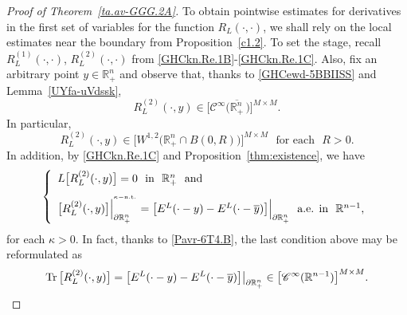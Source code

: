 \documentclass[11pt,reqno]{amsart}
\numberwithin{equation}{section}
\theoremstyle{remark}
\begin{document}
\begin{proof}[Proof of Theorem~\ref{ta.av-GGG.2A}]
To obtain pointwise estimates for derivatives in the first set of variables
for the function $R_L(\cdot,\cdot)$, we shall rely on the local estimates near 
the boundary from Proposition~\ref{c1.2}. To set the stage, recall 
$R^{(1)}_L(\cdot,\cdot)$, $R^{(2)}_L(\cdot,\cdot)$ from \eqref{GHCkn.Re.1B}-\eqref{GHCkn.Re.1C}. 
Also, fix an arbitrary point $y\in{\mathbb{R}}^n_{+}$ and observe that, thanks to 
\eqref{GHCewd-5BBIISS} and Lemma~\ref{UYfa-uVdssk}, 
%
\begin{equation}\label{Pavr-6T4.B}
R^{(2)}_L(\cdot,y)\in\big[{\mathscr{C}}^\infty\big(\overline{{\mathbb{R}}^n_{+}}\,\big)\big]^{M\times M}.
\end{equation}
%
In particular, 
%
\begin{equation}\label{GHCkn.Re.7}
R^{(2)}_L(\cdot,y)\in\big[W^{1,2}({\mathbb{R}}^n_{+}\cap B(0,R)\big)\big]^{M\times M}\,\,\text{ for each }\,\,R>0.
\end{equation}
%
In addition, by \eqref{GHCkn.Re.1C} and Proposition~\ref{thm:existence}, we have
%
\begin{equation}\label{GHCkn.Re.8}
\left\{
\begin{array}{l}
L\big[R^{(2)}_L(\cdot,y)\big]=0\,\,\text{ in }\,\,{\mathbb{R}}^n_{+}\,\,\text{ and}
\\[8pt]
\big[R^{(2)}_L(\cdot,y)\big]\Big|^{{}^{\kappa-{\rm n.t.}}}_{\partial{\mathbb{R}}^n_{+}}
=\big[E^L(\cdot-y)-E^L(\cdot-\overline{y})\big]\Big|_{\partial{\mathbb{R}}^n_{+}}
\,\,\text{ a.e. in }\,\,{\mathbb{R}}^{n-1},
\end{array}
\right.
\end{equation}
%
for each $\kappa>0$. In fact, thanks to \eqref{Pavr-6T4.B}, the 
last condition above may be reformulated as
%
\begin{equation}\label{GHCkn.Re.8BIS}
{\rm Tr}\,\big[R^{(2)}_L(\cdot,y)\big]
=\big[E^L(\cdot-y)-E^L(\cdot-\overline{y})\big]\big|_{\partial{\mathbb{R}}^n_{+}}
\in\big[{\mathscr{C}}^\infty({\mathbb{R}}^{n-1})\big]^{M\times M}.
\end{equation}


\end{proof}
\end{document}
